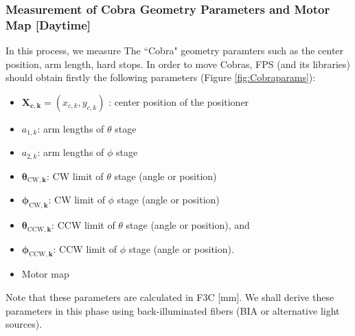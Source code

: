 \subsubsection{Measurement of Cobra Geometry Parameters and Motor Map [Daytime]}\label{secflow:CobraCal}

In this process, we measure The ``Cobra" geometry paramters such as the center position, arm length, hard stops.
In order to move Cobras, FPS (and its libraries) should obtain firstly the following parameters (Figure \ref{fig:Cobraparams}):
\begin{itemize}
\item $\bm{X_{c,k}}=(x_{c,k}, y_{c,k})$ : center position of the positioner
\item $a_{1,k}$: arm lengths of $\theta$ stage
\item $a_{2,k}$: arm lengths of $\phi$ stage
\item $\bm{\theta _{\mathrm{CW},k}}$: CW limit of $\theta$ stage (angle or position)
\item $\bm{\phi _{\mathrm{CW},k}}$: CW limit of $\phi$ stage (angle or position)
\item $\bm{\theta _{\mathrm{CCW},k}}$: CCW limit of $\theta$ stage (angle or position), and
\item $\bm{\phi_{\mathrm{CCW},k}}$: CCW limit of $\phi$ stage (angle or position).
\item Motor map
\end{itemize}
Note that these parameters are calculated in F3C [mm].
We shall derive these parameters in this phase using back-illuminated fibers (BIA or alternative light sources).


